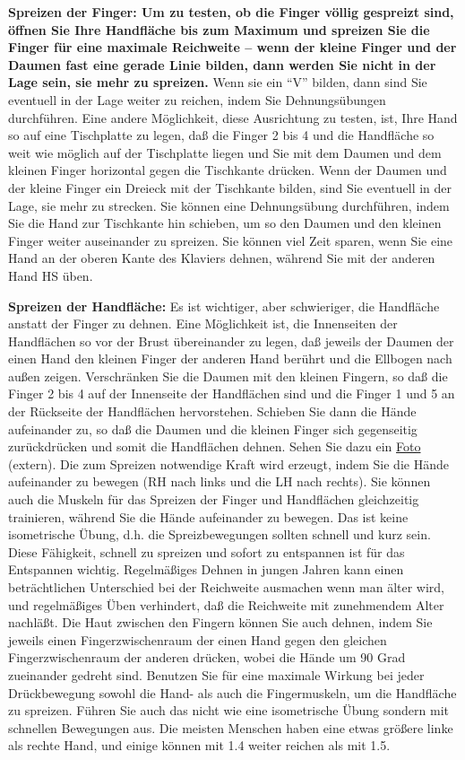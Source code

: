 \textbf{Spreizen der Finger: Um zu testen, ob die Finger völlig gespreizt sind, öffnen Sie Ihre Handfläche bis zum Maximum und spreizen Sie die Finger für eine maximale Reichweite -- wenn der kleine Finger und der Daumen fast eine gerade Linie bilden, dann werden Sie nicht in der Lage sein, sie mehr zu spreizen.}
Wenn sie ein \enquote{V} bilden, dann sind Sie eventuell in der Lage weiter zu reichen, indem Sie Dehnungsübungen durchführen.
Eine andere Möglichkeit, diese Ausrichtung zu testen, ist, Ihre Hand so auf eine Tischplatte zu legen, daß die Finger 2 bis 4 und die Handfläche so weit wie möglich auf der Tischplatte liegen und Sie mit dem Daumen und dem kleinen Finger horizontal gegen die Tischkante drücken.
Wenn der Daumen und der kleine Finger ein Dreieck mit der Tischkante bilden, sind Sie eventuell in der Lage, sie mehr zu strecken.
Sie können eine Dehnungsübung durchführen, indem Sie die Hand zur Tischkante hin schieben, um so den Daumen und den kleinen Finger weiter auseinander zu spreizen.
Sie können viel Zeit sparen, wenn Sie eine Hand an der oberen Kante des Klaviers dehnen, während Sie mit der anderen Hand HS üben.

\textbf{Spreizen der Handfläche:}
Es ist wichtiger, aber schwieriger, die Handfläche anstatt der Finger zu dehnen.
Eine Möglichkeit ist, die Innenseiten der Handflächen so vor der Brust übereinander zu legen, daß jeweils der Daumen der einen Hand den kleinen Finger der anderen Hand berührt und die Ellbogen nach außen zeigen.
Verschränken Sie die Daumen mit den kleinen Fingern, so daß die Finger 2 bis 4 auf der Innenseite der Handflächen sind und die Finger 1 und 5 an der Rückseite der Handflächen hervorstehen.
Schieben Sie dann die Hände aufeinander zu, so daß die Daumen und die kleinen Finger sich gegenseitig zurückdrücken und somit die Handflächen dehnen.
Sehen Sie dazu ein \href{http://www.pianopractice.org/palmstretch.jpg}{Foto} (extern).
Die zum Spreizen notwendige Kraft wird erzeugt, indem Sie die Hände aufeinander zu bewegen (RH nach links und die LH nach rechts).
Sie können auch die Muskeln für das Spreizen der Finger und Handflächen gleichzeitig trainieren, während Sie die Hände aufeinander zu bewegen.
Das ist keine isometrische Übung, d.h. die Spreizbewegungen sollten schnell und kurz sein.
Diese Fähigkeit, schnell zu spreizen und sofort zu entspannen ist für das Entspannen wichtig.
Regelmäßiges Dehnen in jungen Jahren kann einen beträchtlichen Unterschied bei der Reichweite ausmachen wenn man älter wird, und regelmäßiges Üben verhindert, daß die Reichweite mit zunehmendem Alter nachläßt.
Die Haut zwischen den Fingern können Sie auch dehnen, indem Sie jeweils einen Fingerzwischenraum der einen Hand gegen den gleichen Fingerzwischenraum der anderen drücken, wobei die Hände um 90 Grad zueinander gedreht sind.
Benutzen Sie für eine maximale Wirkung bei jeder Drückbewegung sowohl die Hand- als auch die Fingermuskeln, um die Handfläche zu spreizen.
Führen Sie auch das nicht wie eine isometrische Übung sondern mit schnellen Bewegungen aus.
Die meisten Menschen haben eine etwas größere linke als rechte Hand, und einige können mit 1.4 weiter reichen als mit 1.5.

